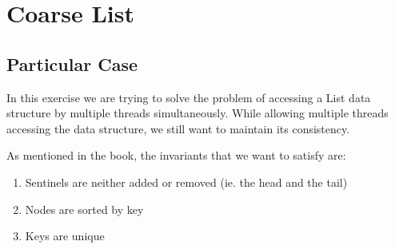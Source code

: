 \section{\textbf{Coarse List}}
\subsection{Particular Case}
\par
In this exercise we are trying to solve the problem of accessing a List data
structure by multiple threads simultaneously. While allowing multiple threads
accessing the data structure, we still want to maintain its consistency. 
\par
As mentioned in the book, the invariants that we want to satisfy are:
\par
\begin{enumerate}
\item Sentinels are neither added or removed (ie. the head and the tail)
\item Nodes are sorted by key
\item Keys are unique
\end{enumerate}
\par
